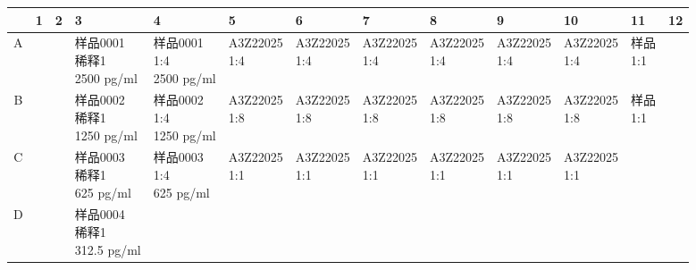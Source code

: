 \documentclass[UTF8,10pt,a4paper,fontset=fandol]{ctexart}
\renewcommand{\arraystretch}{1.15}
\begin{document}
\begin{center}
\scriptsize
\renewcommand{\arraystretch}{1.8}
\begin{tabular}{c|*{12}{p{0.58cm}|}}
 & 1 & 2 & 3 & 4 & 5 & 6 & 7 & 8 & 9 & 10 & 11 & 12\\
\hline
A &
 & &
\shortstack{样品0001\\稀释1\\2500 pg/ml} &
\shortstack{样品0001\\1:4\\2500 pg/ml} &
\shortstack{A3Z22025\\1:4} &
\shortstack{A3Z22025\\1:4} &
\shortstack{A3Z22025\\1:4} &
\shortstack{A3Z22025\\1:4} &
\shortstack{A3Z22025\\1:4} &
\shortstack{A3Z22025\\1:4} &
\shortstack{样品\\1:1} &
\\
\hline
B &
 & &
\shortstack{样品0002\\稀释1\\1250 pg/ml} &
\shortstack{样品0002\\1:4\\1250 pg/ml} &
\shortstack{A3Z22025\\1:8} &
\shortstack{A3Z22025\\1:8} &
\shortstack{A3Z22025\\1:8} &
\shortstack{A3Z22025\\1:8} &
\shortstack{A3Z22025\\1:8} &
\shortstack{A3Z22025\\1:8} &
\shortstack{样品\\1:1} &
\\
\hline
C &
 & &
\shortstack{样品0003\\稀释1\\625 pg/ml} &
\shortstack{样品0003\\1:4\\625 pg/ml} &
\shortstack{A3Z22025\\1:1} &
\shortstack{A3Z22025\\1:1} &
\shortstack{A3Z22025\\1:1} &
\shortstack{A3Z22025\\1:1} &
\shortstack{A3Z22025\\1:1} &
\shortstack{A3Z22025\\1:1} &
 & \\
\hline
D &
 & &
\shortstack{样品0004\\稀释1\\312.5 pg/ml} &

\end{tabular}
\end{center}
\end{document}
